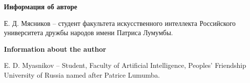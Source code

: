 \documentclass[14pt,a4paper]{extarticle}
\begin{document}
\par\begingroup{}\small
{}\vspace{6pt}\noindent \textbf{Информация об авторе}\par\nopagebreak

Е. Д. Мясников – студент факультета искусственного интеллекта Российского университета дружбы народов имени Патриса Лумумбы.

\vspace{6pt}\noindent \textbf{Information about the author}\par\nopagebreak

E. D. Myasnikov – Student, Faculty of Artificial Intelligence, Peoples' Friendship University of Russia named after Patrice Lumumba.

\par\endgroup
\end{document}
